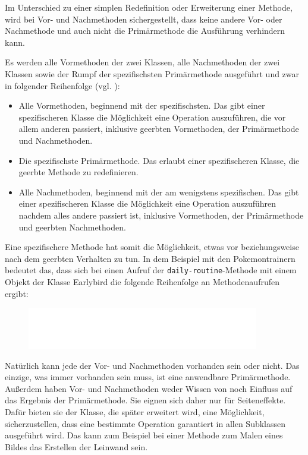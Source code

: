 Im Unterschied zu einer simplen Redefinition oder Erweiterung einer Methode, wird bei Vor- und Nachmethoden sichergestellt, dass keine andere Vor- oder Nachmethode und auch nicht die Primärmethode die Ausführung verhindern kann.

Es werden alle Vormethoden der zwei Klassen, alle Nachmethoden der zwei Klassen sowie der Rumpf der spezifischsten Primärmethode ausgeführt und zwar in folgender Reihenfolge (vgl. \cite[S. 50]{keene}):
\begin{itemize}
 \item Alle Vormethoden, beginnend mit der spezifischsten. Das gibt einer spezifischeren Klasse die Möglichkeit eine Operation auszuführen, die vor allem anderen passiert, inklusive geerbten Vormethoden, der Primärmethode und Nachmethoden.
 \item Die spezifischste Primärmethode. Das erlaubt einer spezifischeren Klasse, die geerbte Methode zu redefinieren.
 \item Alle Nachmethoden, beginnend mit der am wenigstens spezifischen. Das gibt einer spezifischeren Klasse die Möglichkeit eine Operation auszuführen nachdem alles andere passiert ist, inklusive Vormethoden, der Primärmethode und geerbten Nachmethoden.
\end{itemize}

Eine spezifischere Methode hat somit die Möglichkeit, etwas vor beziehungsweise nach dem geerbten Verhalten zu tun. In dem Beispiel mit den Pokemontrainern bedeutet das, dass sich bei einen Aufruf der \texttt{daily-routine}-Methode mit einem Objekt der Klasse Earlybird die folgende Reihenfolge an Methodenaufrufen ergibt:

\begin{figure}[h]
 \centering
 \includegraphics[width=0.9\textwidth]{pictures/primary}
\end{figure}

Natürlich kann jede der Vor- und Nachmethoden vorhanden sein oder nicht. Das einzige, was immer vorhanden sein muss, ist eine anwendbare Primärmethode. Außerdem haben Vor- und Nachmethoden weder Wissen von noch Einfluss auf das Ergebnis der Primärmethode. Sie eignen sich daher nur für Seiteneffekte. Dafür bieten sie der Klasse, die später erweitert wird, eine Möglichkeit, sicherzustellen, dass eine bestimmte Operation garantiert in allen Subklassen ausgeführt wird. Das kann zum Beispiel bei einer Methode zum Malen eines Bildes das Erstellen der Leinwand sein.

